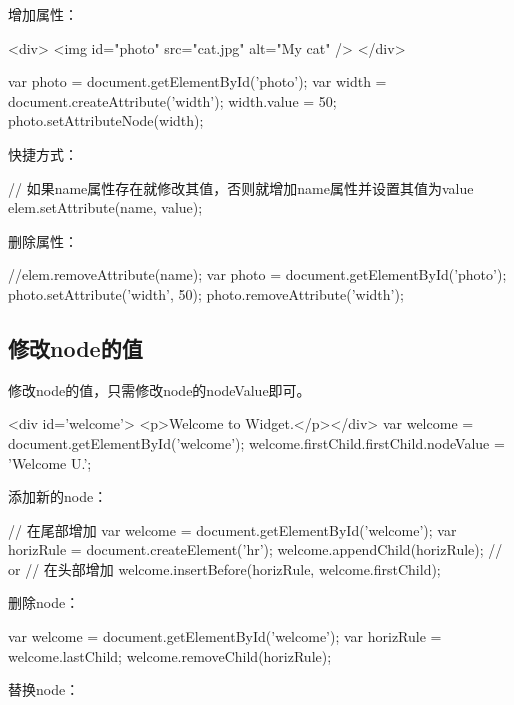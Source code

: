 增加属性：

\begin{javascriptcode}
  <div>
    <img id="photo" src="cat.jpg" alt="My cat" />
  </div>

  var photo = document.getElementById('photo');
  var width = document.createAttribute('width');
  width.value = 50;
  photo.setAttributeNode(width);
\end{javascriptcode}

快捷方式：

\begin{javascriptcode}
  // 如果name属性存在就修改其值，否则就增加name属性并设置其值为value
  elem.setAttribute(name, value);
\end{javascriptcode}

删除属性：

\begin{javascriptcode}
  //elem.removeAttribute(name);
  var photo = document.getElementById('photo');
  photo.setAttribute('width', 50);
  photo.removeAttribute('width');
\end{javascriptcode}


\subsection[修改node的值]{修改node的值}
修改node的值，只需修改node的nodeValue即可。

\begin{javascriptcode}
  <div id='welcome'> <p>Welcome to Widget.</p></div>
  var welcome = document.getElementById('welcome');
  welcome.firstChild.firstChild.nodeValue = 'Welcome U.';
\end{javascriptcode}

添加新的node：

\begin{javascriptcode}
  // 在尾部增加
  var welcome = document.getElementById('welcome');
  var horizRule = document.createElement('hr');
  welcome.appendChild(horizRule);
  // or
  // 在头部增加
  welcome.insertBefore(horizRule, welcome.firstChild);
\end{javascriptcode}

删除node：

\begin{javascriptcode}
  var welcome = document.getElementById('welcome');
  var horizRule = welcome.lastChild;
  welcome.removeChild(horizRule);
\end{javascriptcode}

替换node：

